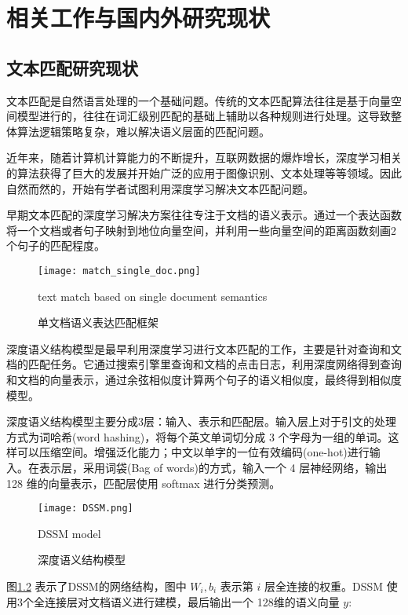 
\chapter{相关工作与国内外研究现状}
\label{chapter:relate}

\section{文本匹配研究现状}
\label{sec:text_matching}

文本匹配是自然语言处理的一个基础问题。传统的文本匹配算法往往是基于向量空间模型进行的，往往在词汇级别匹配的基础上辅助以各种规则进行处理。这导致整体算法逻辑策略复杂，难以解决语义层面的匹配问题。

近年来，随着计算机计算能力的不断提升，互联网数据的爆炸增长，深度学习相关的算法获得了巨大的发展并开始广泛的应用于图像识别、文本处理等等领域。因此自然而然的，开始有学者试图利用深度学习解决文本匹配问题。

早期文本匹配的深度学习解决方案往往专注于文档的语义表示。通过一个表达函数将一个文档或者句子映射到地位向量空间，并利用一些向量空间的距离函数刻画2个句子的匹配程度。

\begin{figure}[!htbp]\centering
  \texttt{[image: match\_single\_doc.png]}
  \caption{单文档语义表达匹配框架}{text match based on single document semantics}
  \label{fig:text match based on single document semantics}       %
\end{figure}

深度语义结构模型\cite{Huang2013LearningDS}是最早利用深度学习进行文本匹配的工作，主要是针对查询和文档的匹配任务。它通过搜索引擎里查询和文档的点击日志，利用深度网络得到查询和文档的向量表示，通过余弦相似度计算两个句子的语义相似度，最终得到相似度模型。

深度语义结构模型主要分成3层：输入、表示和匹配层。输入层上对于引文的处理方式为词哈希(word hashing)，将每个英文单词切分成 3 个字母为一组的单词。这样可以压缩空间。增强泛化能力；中文以单字的一位有效编码(one-hot)进行输入。在表示层，采用词袋(Bag of words)的方式，输入一个 4 层神经网络，输出 128 维的向量表示，匹配层使用 softmax 进行分类预测。

\begin{figure}[!htbp]\centering
  \texttt{[image: DSSM.png]}
  \caption{深度语义结构模型}{DSSM model}
  \label{fig:DSSM}       %
\end{figure}

图\ref{fig:DSSM} 表示了DSSM的网络结构，图中 $W_i,b_i$ 表示第 $i$ 层全连接的权重。DSSM 使用3个全连接层对文档语义进行建模，最后输出一个 128维的语义向量 $y$:

